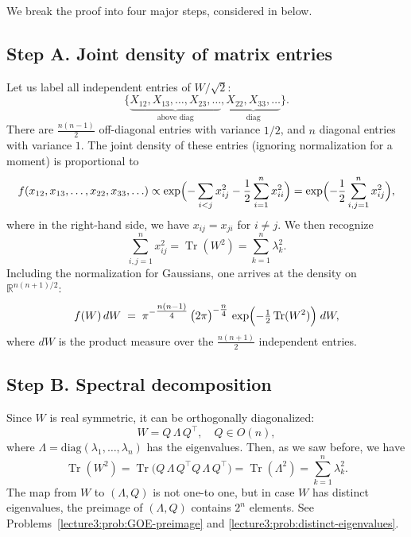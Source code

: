 \documentclass[letterpaper,11pt,oneside,reqno]{book}
\numberwithin{equation}{chapter}  %
\theoremstyle{definition}
\begin{document}
We break the proof into four major steps,
considered in
below.

\subsection{Step A. Joint density of matrix entries}
\label{lecture3:subsec:density-entries}

Let us label all independent entries of \(W/\sqrt 2\):
\[
	\{\underbrace{X_{12}, X_{13},\dots, X_{23},\ldots }_{\text{above diag}},
	\underbrace{X_{22}, X_{33},\dots}_{\text{diag}}\}.
\]
There are \(\frac{n(n-1)}{2}\) off-diagonal entries
with variance $1/2$,
and \(n\) diagonal entries with variance $1$.
The joint density of these entries (ignoring normalization for a moment) is
proportional to
\begin{equation}
	\label{lecture3:eq:GOE-density-entries-first}
	f(x_{12},x_{13},\ldots,x_{22},x_{33},\ldots )
  \propto\exp\Bigl(
    - \sum_{i<j} x_{ij}^2
    -\frac{1}{2} \sum_{i=1}^n x_{ii}^2
  \Bigr)=
	\exp
	\Bigl( -\frac{1}{2}\sum_{i,j=1}^n x_{ij}^2 \Bigr),
\end{equation}
where in the right-hand side, we have
$x_{ij}=x_{ji}$ for $i\ne j$.
We then recognize
\[
	\sum_{i,j=1}^n x_{ij}^2=\operatorname{Tr}(W^2)=\sum_{k=1}^n \lambda_k^2.
\]
Including the normalization for Gaussians, one arrives at
the density on $\mathbb{R}^{n(n+1)/2}$:
\[
  f(W)\,dW
  \;=\;
  \pi^{-\tfrac{n(n-1)}{4}}
  \,\bigl(2\pi\bigr)^{-\tfrac{n}{4}}
  \,\exp\Bigl(-\tfrac{1}{2}\operatorname{Tr}(W^2)\Bigr)\; dW,
\]
where \(dW\) is the product measure over the \(\tfrac{n(n+1)}{2}\) independent entries.

\subsection{Step B. Spectral decomposition}
\label{lecture3:subsec:spectral}

Since \(W\) is real symmetric, it can be orthogonally diagonalized:
\[
  W = Q\,\Lambda\,Q^\top,\quad
  Q \in O(n),
\]
where \(\Lambda = \mathrm{diag}(\lambda_1,\ldots,\lambda_n)\) has the eigenvalues.  Then, as we saw before, we have
\[
  \operatorname{Tr}(W^2)
  = \operatorname{Tr}\bigl(Q\,\Lambda\,Q^\top Q\,\Lambda\,Q^\top\bigr)
  = \operatorname{Tr}(\Lambda^2)
  = \sum_{k=1}^n \lambda_k^2.
\]
The map
from $W$ to $(\Lambda,Q)$ is not one-to one,
but in case $W$ has distinct eigenvalues,
the preimage of $(\Lambda,Q)$
contains $2^n$ elements.
See Problems~\ref{lecture3:prob:GOE-preimage} and \ref{lecture3:prob:distinct-eigenvalues}.
\medskip
\end{document}
